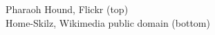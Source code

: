 \documentclass[t,handout]{beamer}  %
\begin{document}
{
\begin{frame}[b]
	
\tiny  Pharaoh Hound, Flickr  (top)\\Home-Skilz, Wikimedia public domain (bottom)
\end{frame}
}
%	
%	
%
%	
%	
%
%
%	
%	
%
%	
%	
%	
%	
%
%
%
%	
%		
%	
%	
\end{document}
